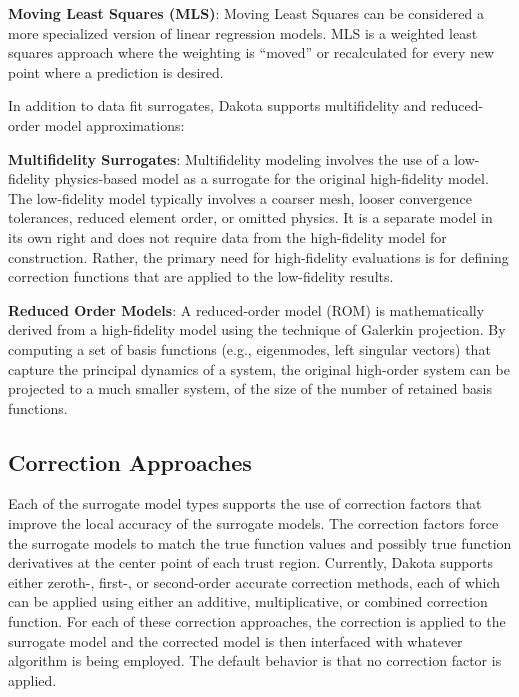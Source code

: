 \textbf{Moving Least Squares (MLS)}: Moving Least Squares can be 
considered a more specialized version of linear regression models.
MLS is a weighted least squares approach where the weighting is 
``moved'' or recalculated for every new point where 
a prediction is desired.~\cite{Nea04} 


In addition to data fit surrogates, Dakota supports multifidelity 
and reduced-order model approximations:

\textbf{Multifidelity Surrogates}: Multifidelity modeling involves the
use of a low-fidelity physics-based model as a surrogate for the
original high-fidelity model.  The low-fidelity model typically
involves a coarser mesh, looser convergence tolerances, reduced
element order, or omitted physics.  It is a separate model in its own
right and does not require data from the high-fidelity model for
construction.  Rather, the primary need for high-fidelity evaluations
is for defining correction functions that are applied to the
low-fidelity results.

\textbf{Reduced Order Models}: A reduced-order model (ROM) is
mathematically derived from a high-fidelity model using the technique
of Galerkin projection.  By computing a set of basis functions (e.g.,
eigenmodes, left singular vectors) that capture the principal dynamics
of a system, the original high-order system can be projected to a much
smaller system, of the size of the number of retained basis functions.

\subsection{Correction Approaches}

Each of the surrogate model types supports the use of correction
factors that improve the local accuracy of the surrogate models. The
correction factors force the surrogate models to match the true
function values and possibly true function derivatives at the center
point of each trust region. Currently, Dakota supports either zeroth-,
first-, or second-order accurate correction methods, each of which can
be applied using either an additive, multiplicative, or combined
correction function. For each of these correction approaches, the
correction is applied to the surrogate model and the corrected model
is then interfaced with whatever algorithm is being employed.  The
default behavior is that no correction factor is applied.

